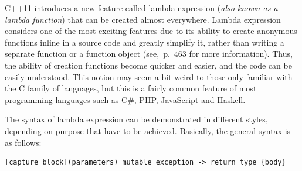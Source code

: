 \documentclass[11pt]{report}
\begin{document}
C++11 introduces a new feature called lambda expression (\emph{also known as a lambda function}) that can be created almost everywhere. Lambda expression considers one of the most exciting features due to its ability to create anonymous functions inline in a source code and greatly simplify it, rather than writing a separate function or a function object (see\cite{Gregorie:professionalcpp},~p.~463 for more information). Thus, the ability of creation functions become quicker and easier, and the code can be easily understood. This notion may seem a bit weird to those only familiar with the C family of languages, but this is a fairly common feature of most programming languages such as C\#, PHP, JavaScript and Haskell.

The syntax of lambda expression can be demonstrated in different styles, depending on purpose that have to be achieved. Basically, the general syntax is as follows:
\begin{lstlisting}
[capture_block](parameters) mutable exception -> return_type {body}
\end{lstlisting}
\end{document}

